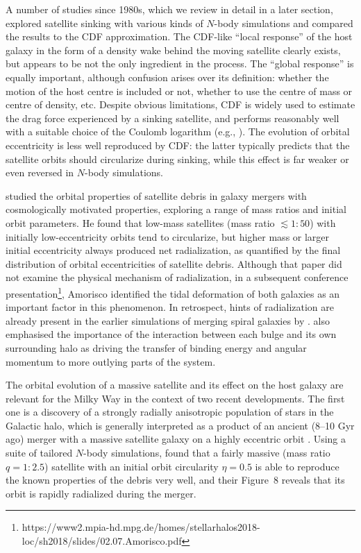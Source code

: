 \documentclass[twocolumn]{aastex63}
\begin{document}
A number of studies since 1980s, which we review in detail in a later section, explored satellite sinking with various kinds of $N$-body simulations and compared the results to the CDF approximation. The CDF-like ``local response'' of the host galaxy in the form of a density wake behind the moving satellite clearly exists, but appears to be not the only ingredient in the process. The ``global response'' is equally important, although confusion arises over its definition: whether the motion of the host centre is included or not, whether to use the centre of mass or centre of density, etc. Despite obvious limitations, CDF is widely used to estimate the drag force experienced by a sinking satellite, and performs reasonably well with a suitable choice of the Coulomb logarithm (e.g., \citealt{Hashimoto2003}). The evolution of orbital eccentricity is less well reproduced by CDF: the latter typically predicts that the satellite orbits should circularize during sinking, while this effect is far weaker or even reversed in $N$-body simulations. 

\citet{Amorisco2017} studied the orbital properties of satellite debris in galaxy mergers with cosmologically motivated properties, exploring a range of mass ratios and initial orbit parameters. He found that low-mass satellites (mass ratio $\lesssim 1:50$) with initially low-eccentricity orbits tend to circularize, but higher mass or larger initial eccentricity always produced net radialization, as quantified by the final distribution of orbital eccentricities of satellite debris. Although that paper did not examine the physical mechanism of radialization, in a subsequent conference presentation\footnote{https://www2.mpia-hd.mpg.de/homes/stellarhalos2018-loc/sh2018/slides/02.07.Amorisco.pdf}, Amorisco identified the tidal deformation of both galaxies as an important factor in this phenomenon. In retrospect, hints of radialization are already present in the earlier simulations of merging spiral galaxies by \citet[][see especially figures 6 and 7]{Barnes1988}. \citet{Barnes1992} also emphasised the importance of the interaction between each bulge and its own surrounding halo as driving the transfer of binding energy and angular momentum to more outlying parts of the system.

The orbital evolution of a massive satellite and its effect on the host galaxy are relevant for the Milky Way in the context of two recent developments. The first one is a discovery of a strongly radially anisotropic population of stars in the Galactic halo, which is generally interpreted as a product of an ancient (8--10 Gyr ago) merger with a massive satellite galaxy on a highly eccentric orbit \citep{Belokurov2018,Helmi2018}. Using a suite of tailored $N$-body simulations, \citet{Naidu2021} found that a fairly massive (mass ratio $q=1:2.5$) satellite with an initial orbit circularity $\eta=0.5$ is able to reproduce the known properties of the debris very well, and their Figure~8 reveals that its orbit is rapidly radialized during the merger.
\end{document}
